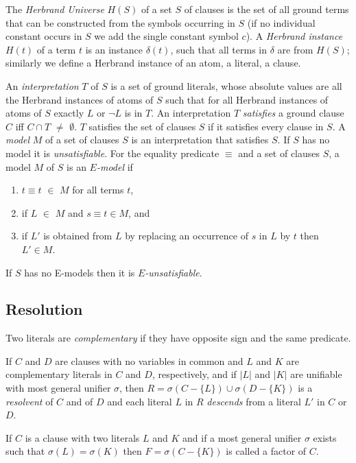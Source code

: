 The {\em Herbrand Universe\/} $H(S)$ of a set $S$ of clauses is the
set of all ground terms that can be constructed from the symbols
occurring in $S$ (if no individual constant occurs in $S$ we add the
single constant symbol $c$). A {\em Herbrand instance\/} $H(t)$ of a
term $t$ is an instance $\delta(t)$, such that all terms in $\delta$
are from $H(S)$; similarly we define a Herbrand instance of an atom, a
literal, a clause. 

An {\em interpretation\/} $T$ of $S$ is a set of
ground literals, whose absolute values are all the Herbrand instances
of atoms of $S$ such that for all Herbrand instances of atoms of $S$
exactly $L$ or $\neg L$ is in $T$. An interpretation $T$ {\em
satisfies\/} a ground clause $C$ iff $C \cap T$ $\neq$ $\emptyset$.
$T$ satisfies the set of clauses $S$ if it satisfies every clause in
$S$. A {\em model\/} $M$ of a set of clauses $S$ is an interpretation
that satisfies $S$. If $S$ has no model it is {\em unsatisfiable\/}.
For the equality predicate $\equiv$ and a set of clauses $S$, a model
$M$ of $S$ is an $E${\em -model\/} if \nopagebreak[4]
\begin{enumerate}
	\item	$t \equiv  t$ $\in$ $M$  for all terms $t$,
	\item	if $L$ $\in$ $M$ and $s \equiv t \in M$, and 
\item if $L'$ is obtained from $L$ by 	
	replacing an occurrence of $s$ in $L$ by $t$ then $L' \in M$.
\end{enumerate}\nopagebreak
If $S$ has no E-models then it is $E${\em -unsatisfiable\/}.

\subsection{Resolution}
\label{Resolution}

Two literals are {\em complementary\/} if 
they have opposite sign and the same predicate.

If $C$ and $D$ are clauses with no variables in common and $L$ and $K$
are complementary literals in $C$ and $D$, respectively, and if $|L|$
and $|K|$ are unifiable with most general unifier $\sigma$, then $R=
\sigma(C-\{L\}) \cup \sigma (D-\{K\})$ is a  {\em
resolvent\/} of $C$ and of $D$ and each literal $L$ in $R$ {\em
descends\/} from a literal $L'$ in $C$ or $D$.

If $C$ is a clause with two literals $L$ and $K$ and if a most general 
unifier $\sigma$ exists such that  $\sigma(L) = \sigma(K)$ 
then  $F = \sigma(C-\{K\})$ is called a factor of $C$. 


